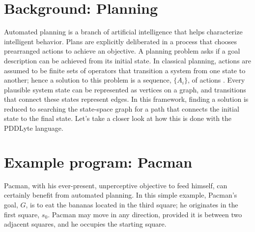 \documentclass[
a4paper, %
11pt, %
onecolumn, %
openany, %
]{memoir}
\begin{document}
\section{Background: Planning}
{\setlength{\parindent}{0cm}

Automated planning is a branch of artificial intelligence that helps characterize intelligent behavior. Plans are explicitly deliberated in a process that chooses prearranged actions to achieve an objective. A planning problem asks if a goal description can be achieved from its initial state. In classical planning, actions are assumed to be finite sets of operators that transition a system from one state to another; hence a solution to this problem is a sequence, $\{A_i\}$, of actions \cite{ai_rn}. Every plausible system state can be represented as vertices on a  graph, and transitions that connect these states represent edges. In this framework, finding a solution is reduced to searching the state-space graph for a path that connects the initial state to the final state. Let's take a closer look at how this is done with the PDDLyte language.


\section{Example program: Pacman}

Pacman, with his ever-present, unperceptive objective to feed himself, can certainly benefit from automated planning. In this simple example, Pacman's goal, $G$, is to eat the bananas located in the third square; he originates in the first square, $s_0$. Pacman may move in any direction, provided it is between two adjacent squares, and he occupies the starting square.\\

}
\end{document}
